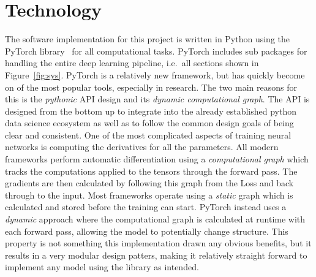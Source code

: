 \chapter{Technology}\label{cha:tech}

The software implementation for this project is written in Python using the PyTorch library~\parencite{NEURIPS2019_9015} for all computational tasks.
PyTorch includes sub packages for handling the entire deep learning pipeline, i.e.~all sections shown in Figure~\ref{fig:sys}.
PyTorch is a relatively new framework, but has quickly become on of the most popular tools, especially in research.
The two main reasons for this is the \textit{pythonic} API design and its \textit{dynamic computational graph}.
The API is designed from the bottom up to integrate into the already established python data science ecosystem as well as to follow the common design goals of being clear and consistent.
One of the most complicated aspects of training neural networks is computing the derivatives for all the parameters.
All modern frameworks perform automatic differentiation using a \textit{computational graph} which tracks the computations applied to the tensors through the forward pass.
The gradients are then calculated by following this graph from the Loss and back through to the input.
Most frameworks operate using a \textit{static} graph which is calculated and stored before the training can start.
PyTorch instead uses a \textit{dynamic} approach where the computational graph is calculated at runtime with each forward pass, allowing the model to potentially change structure.
This property is not something this implementation drawn any obvious benefits, but it results in a very modular design patters, making it relatively straight forward to implement any model using the library as intended.  

